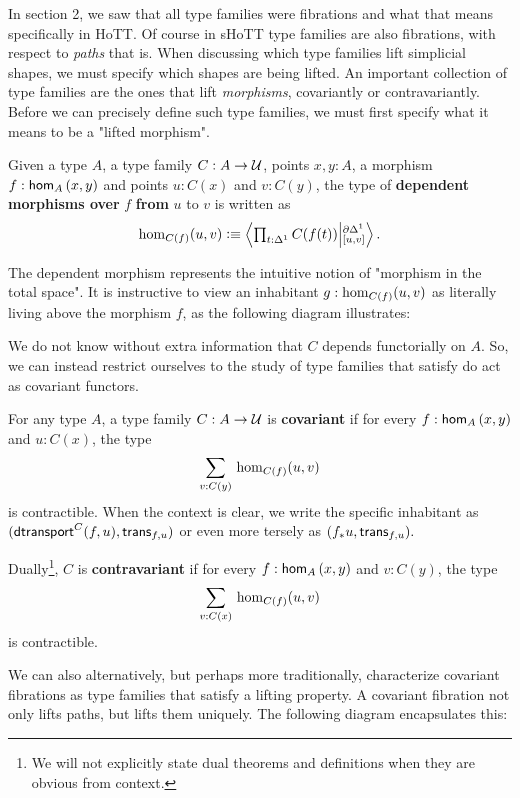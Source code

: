\documentclass[main.tex]{subfiles}
\begin{document}
In section 2, we saw that all type families were fibrations and what that means specifically in HoTT. Of course in sHoTT type 
families are also fibrations, with respect to \textit{paths} that is. When discussing which type families lift simplicial shapes,
we must specify which shapes are being lifted. An important collection of type families are the ones that lift \textit{morphisms},
covariantly or contravariantly. Before we can precisely define such type families, we must first specify what it means to be a 
 "lifted morphism".
\begin{definition}
Given a type $A$, a type family $C : A \to \U$, points $x,y : A$, a morphism $f : \ho[A]{x}{y}$ and points $u : C(x)$ and $v : C(y)$, the type of \textbf{dependent morphisms over} $f$ \textbf{from} $u$ to $v$ is written as $$
\dho{C}{f}{u}{v} \defeq \exten{t : \osx}{C(f(t))}{\pardo}{[u,v]}.$$
\end{definition}
The dependent morphism represents the intuitive notion of "morphism in the total space". It is instructive to view an inhabitant $g :\dho{C}{f}{u}{v}$ as literally living above the morphism $f$, as the following diagram illustrates:

\begin{figure}[h]
    
\end{figure}

We do not know without extra information that $C$ depends functorially on $A$. So, we can instead restrict ourselves to the study of type families that satisfy do act as covariant functors.
\begin{definition}
For any type $A$, a type family $C : A \to \U$ is \textbf{covariant} if for every $f : \ho[A]{x}{y}$  and $u : C(x)$, the type $$\sm{v : C(y)} \dho{C}{f}{u}{v}$$
is contractible. When the context is clear, we write the specific inhabitant as $(\dtran{C}(f, u), \trans{f}{u})$ or 
even more tersely as $(f_*u, \trans{f}{u}).$

Dually\footnote{We will not explicitly state dual theorems and definitions when they are obvious from context.}, $C$ is \textbf{contravariant} if for every $f : \ho[A]{x}{y}$  and $v : C(y)$, the type $$\sm{v : C(x)} \dho{C}{f}{u}{v}$$
is contractible.
\end{definition}
We can also alternatively, but perhaps more traditionally, characterize covariant fibrations as type families that satisfy a lifting property. A covariant fibration not only lifts paths, but lifts them uniquely. The following diagram encapsulates this:
\end{document}
